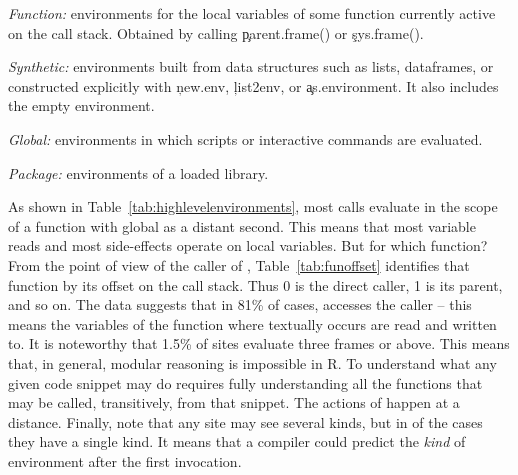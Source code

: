 \documentclass[screen,acmsmall]{acmart}
\begin{document}
\begin{compactitem}[---]
\item \emph{Function:} environments for the local variables of some function
  currently active on the call stack. Obtained by calling \c{parent.frame()} or
  \c{sys.frame()}.
\item \emph{Synthetic:} environments built from data structures such as lists,
  dataframes, or constructed explicitly with \c{new.env}, \c{list2env}, or
  \c{as.environment}. It also includes the empty environment.
\item \emph{Global:}  environments in which scripts or interactive commands
  are evaluated.
\item \emph{Package:}  environments of a loaded library.
\end{compactitem}

\noindent
As shown in Table~\ref{tab:highlevelenvironments}, most calls evaluate in the
scope of a function with global as a distant second. This means that most
variable reads and most side-effects operate on local variables. But for which
function? From the point of view of the caller of \eval,
Table~\ref{tab:funoffset} identifies that function by its offset on the call
stack. Thus 0 is the direct caller, 1 is its parent, and so on. The data
suggests that in 81\% of cases, \eval accesses the caller -- this means the
variables of the function where \eval textually occurs are read and written to.
It is noteworthy that 1.5\% of sites evaluate three frames or above. This means
that, in general, modular reasoning is impossible in R. To understand what any
given code snippet may do requires fully understanding all the functions that
may be called, transitively, from that snippet. The actions of \eval happen at a
distance. Finally, note that any site may see several kinds, but in
\packageNbOneCategoryEnvirSitePercent of the cases they have a single kind. It
means that a compiler could predict the \emph{kind} of environment after the
first invocation.
\end{document}
